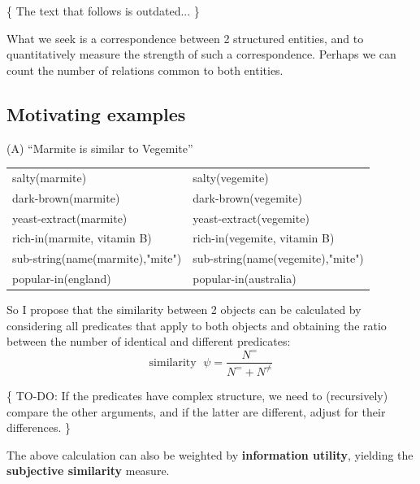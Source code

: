 \{ The text that follows is outdated... \}
\underconst

What we seek is a correspondence between 2 structured entities, and to quantitatively measure the strength of such a correspondence.  Perhaps we can count the number of relations common to both entities.

\subsection{Motivating examples}

(A) ``Marmite is similar to Vegemite''\\
\hspace*{1cm} \begin{tabular}{l|l}
salty(marmite)                   & salty(vegemite)\\
dark-brown(marmite)              & dark-brown(vegemite)\\
yeast-extract(marmite)           & yeast-extract(vegemite)\\
rich-in(marmite, vitamin B)      & rich-in(vegemite, vitamin B)\\
sub-string(name(marmite),"mite") & sub-string(name(vegemite),"mite")\\
popular-in(england)              & popular-in(australia)
\end{tabular}

So I propose that the similarity between 2 objects can be calculated by considering all predicates that apply to both objects and obtaining the ratio between the number of identical and different predicates:
\begin{equation}
\mbox{similarity } \; \psi = \frac{N^{=}}{N^{=} + N^{\neq}}
\end{equation}

\{ TO-DO:  If the predicates have complex structure, we need to (recursively) compare the other arguments, and if the latter are different, adjust for their differences. \}

The above calculation can also be weighted by \textbf{information utility}, yielding the \textbf{subjective similarity} measure.


